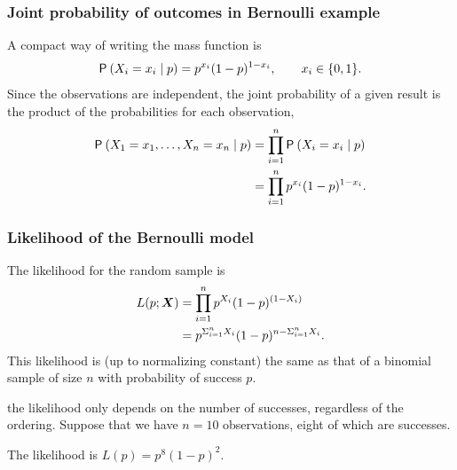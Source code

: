 \documentclass{beamer}
\begin{document}
\begin{frame}[fragile]
\frametitle{Joint probability of outcomes in Bernoulli example}
 A compact way of writing the mass function is
\begin{align*}
\P{X_i=x_i  \mid p}=p^{x_i} (1-p)^{1-x_i}, \qquad x_i \in \{0, 1\}.
\end{align*}
Since the observations are independent, the joint probability of a given result is the product of the probabilities for each observation,
\begin{align*}
\P{X_1=x_1, \ldots, X_n=x_n \mid p}&=\prod_{i=1}^n \P{X_i=x_i  \mid p}
\\&=\prod_{i=1}^n  p^{x_i} (1-p)^{1-x_i}.
\end{align*}
\end{frame}


\begin{frame}[fragile]
\frametitle{Likelihood of the Bernoulli model}
The likelihood for the random sample is 
\begin{align*}
L(p; \bs{X}) &=\prod_{i=1}^n p^{X_i} (1-p)^{(1-X_i)}\\&= p^{\Sigma_{i=1}^n X_i}(1-p)^{n-\Sigma_{i=1}^n X_i}.
\end{align*}
% 
This likelihood is (up to normalizing constant) the same as that of a binomial sample of size $n$ with probability of success $p$.
\bi
\item the likelihood only depends on the number of successes, regardless of the ordering.
\ei
 Suppose that we have $n=10$ observations, eight of which are successes.
 \bi
\item The likelihood is $L(p)=p^8(1-p)^2$. %
\ei
\end{frame}
\end{document}
